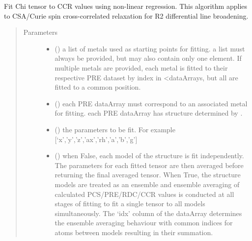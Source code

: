 \documentclass[a4paper,10pt,english,openany,oneside]{sphinxmanual}
\begin{document}
\begin{fulllineitems}
\label{\detokenize{reference/generated/paramagpy.fit.nlr_fit_metal_from_ccr:paramagpy.fit.nlr_fit_metal_from_ccr}}
Fit Chi tensor to CCR values using non-linear regression.
This algorithm applies to CSA/Curie spin cross-correlated relaxation
for R2 differential line broadening.
\begin{quote}\begin{description}
\item[{Parameters}] \leavevmode\begin{itemize}
\item {} 
 () \textendash{} a list of metals used as starting points for fitting.
a list must always be provided, but may also contain
only one element. If multiple metals are provided, each metal
is fitted to their respective PRE dataset by index in \textless{}dataArrays,
but all are fitted to a common position.

\item {} 
 () \textendash{} each PRE dataArray must correspond to an associated metal for fitting.
each PRE dataArray has structure determined by
{\hyperref[\detokenize{reference/generated/paramagpy.protein.CustomStructure.parse:paramagpy.protein.CustomStructure.parse}]{}}.

\item {} 
 () \textendash{} the parameters to be fit.
For example {[}‘x’,’y’,’z’,’ax’,’rh’,’a’,’b’,’g’{]}

\item {} 
 (\sphinxstyleliteralemphasis{\sphinxupquote{, }}) \textendash{} when False, each model of the structure is fit independently.
The parameters for each fitted tensor are then averaged before
returning the final averaged tensor.
When True, the structure models are treated as an ensemble and
ensemble averaging of calculated PCS/PRE/RDC/CCR values is
conducted at all stages of fitting to fit a single tensor to all
models simultaneously. The ‘idx’ column of the dataArray
determines the ensemble averaging behaviour with common indices
for atoms between models resulting in their summation.


\end{itemize}
\end{description}
\end{quote}
\end{fulllineitems}
\end{document}
